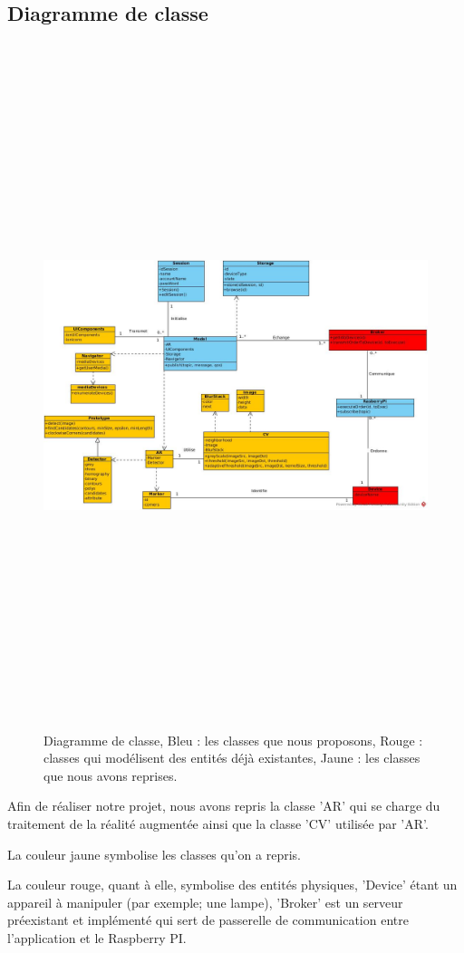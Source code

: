 \documentclass[12pt,a4paper]{article}
\begin{document}
\subsection{Diagramme de classe}
\begin{figure}[!ht]
  \centering
  \includegraphics[width = 15cm,height=20cm]{DDC_C.jpg}
  \caption{Diagramme de classe,
  Bleu : les classes que nous proposons, 
  Rouge : classes qui modélisent des entités déjà existantes, 
  Jaune : les classes que nous avons reprises. 
  }
\end{figure}
\newpage
\par
Afin de réaliser notre projet, nous avons repris la classe 'AR' qui se charge du traitement de la réalité augmentée ainsi que la classe 'CV' utilisée par 'AR'.\par
La couleur jaune symbolise les classes qu'on a repris.\par
La couleur rouge, quant à elle, symbolise des entités physiques, 'Device' étant un appareil à manipuler (par exemple; une lampe), 'Broker' est un serveur préexistant et implémenté qui sert de passerelle de communication entre l'application et le Raspberry PI.\par 
\end{document}
